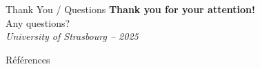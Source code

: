 \documentclass{beamer}
\begin{document}
\begin{frame}{Thank You / Questions}
\centering
\Huge \textbf{Thank you for your attention!} \\
\vspace{1cm}
\Large Any questions? \\
\vspace{0.5cm}
\textit{University of Strasbourg – 2025}
\end{frame}



\begin{frame}[allowframebreaks]{Références}
  \nocite{*}
  
  
\end{frame}
\end{document}
